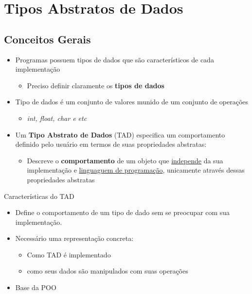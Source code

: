 \documentclass{beamer}
\begin{document}
\section{Tipos Abstratos de Dados}
\subsection{Conceitos Gerais}
\begin{frame}{}
    
\begin{itemize}
\item Programas possuem tipos de dados que são característicos de cada implementação
\begin{itemize}
 \item Preciso definir claramente os \textbf{tipos de dados}
\end{itemize}
 \item Tipo de dados é um conjunto de valores munido de um conjunto de operações
 \begin{itemize}
  \item \emph{int, float, char e etc}
 \end{itemize}

\end{itemize}

\end{frame}

\begin{frame}{}
    
\begin{itemize}
\item Um \textbf{Tipo Abstrato de Dados} (TAD) especifica um comportamento definido pelo usuário em termos de suas propriedades abstratas:
\begin{itemize}
 \item Descreve o \textbf{comportamento} de um objeto que \underline{independe} da sua implementação e \underline{linguaguem de programação}, unicamente através dessas propriedades abstratas
\end{itemize}

\end{itemize}

\end{frame}

\begin{frame}{Características do TAD}
    
\begin{itemize}
 \item Define o comportamento de um tipo de dado sem se preocupar com sua implementação.
 \item Necessário uma representação concreta:
 \begin{itemize}
  \item Como TAD é implementado
  \item como seus dados são manipulados com suas operações
  
 \end{itemize}
\item Base da POO
\end{itemize}

\end{frame}
\end{document}
